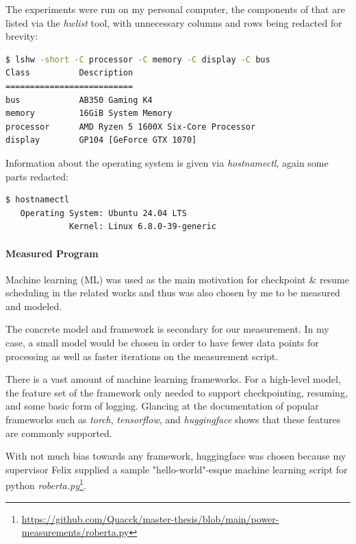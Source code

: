 The experiments were run on my personal computer, the components of that are listed via the \emph{hwlist} tool, with unnecessary columns and rows being redacted for brevity:

\begin{lstlisting}[language=bash, frame=single, numbers=none, caption={Hardware that was measured}, basicstyle=\ttfamily]
   $ lshw -short -C processor -C memory -C display -C bus
Class          Description
==========================
bus            AB350 Gaming K4
memory         16GiB System Memory
processor      AMD Ryzen 5 1600X Six-Core Processor
display        GP104 [GeForce GTX 1070]
\end{lstlisting}

Information about the operating system is given via \emph{hostnamectl}, again some parts redacted:

\begin{lstlisting}[language=bash, frame=single, numbers=none, caption={Used operating system information}, basicstyle=\ttfamily]
    $ hostnamectl 
   Operating System: Ubuntu 24.04 LTS                
             Kernel: Linux 6.8.0-39-generic
\end{lstlisting}

\paragraph{Measured Program}

Machine learning (ML) was used as the main motivation for checkpoint \& resume scheduling in the related works\cite {wiesner_lets_2021} and thus was also chosen by me to be measured and modeled. 

The concrete model and framework is secondary for our measurement. In my case, a small model would be chosen in order to have fewer data points for processing as well as faster iterations on the measurement script. 

There is a vast amount of machine learning frameworks. For a high-level model, the feature set of the framework only needed to support checkpointing, resuming, and some basic form of logging. 
Glancing at the documentation of popular frameworks such as \emph{torch}, \emph{tensorflow}, and \emph{huggingface} shows that these features are commonly supported. 

With not much bias towards any framework, huggingface was chosen because my supervisor Felix supplied a sample "hello-world"-esque machine learning script for python \emph{roberta.py}\footnote{\url{https://github.com/Quacck/master-thesis/blob/main/power-measurements/roberta.py}}.

